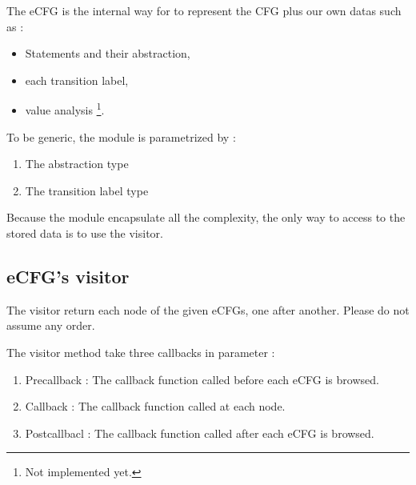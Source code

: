 The \gls{eCFG} is the internal way for \flatac to represent the  \gls{CFG} plus our own datas such as :
\begin{itemize}
	\item Statements and their abstraction,
	\item each transition label,
	\item value analysis \footnote{Not implemented yet.}.
\end{itemize}

To be generic, the module is parametrized by :
\begin{enumerate}
	\item The abstraction type
	\item The transition label type
\end{enumerate}


Because the module encapsulate all the complexity, the only way to access to the stored data is to use the visitor.

\subsection{eCFG's visitor}
The visitor return each node of the given eCFGs, one after another. Please do not assume any order.

The visitor method take three callbacks in parameter :
\begin{enumerate}
	\item Precallback : The callback function called before each \gls{eCFG} is browsed.
	\item Callback : The callback function called at each node.
	\item Postcallbacl : The callback function called after each \gls{eCFG} is browsed.
\end{enumerate}
